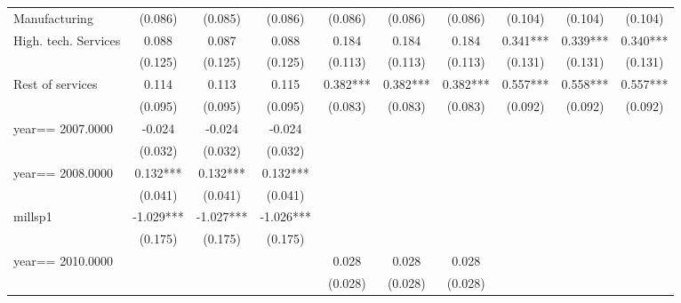 \begin{table}[htbp]
\begin{tabular}{l*{9}{c}}
Manufacturing       &     (0.086)   &     (0.085)   &     (0.086)   &     (0.086)   &     (0.086)   &     (0.086)   &     (0.104)   &     (0.104)   &     (0.104)   \\
High. tech. Services&       0.088   &       0.087   &       0.088   &       0.184   &       0.184   &       0.184   &       0.341***&       0.339***&       0.340***\\
                    &     (0.125)   &     (0.125)   &     (0.125)   &     (0.113)   &     (0.113)   &     (0.113)   &     (0.131)   &     (0.131)   &     (0.131)   \\
Rest of services    &       0.114   &       0.113   &       0.115   &       0.382***&       0.382***&       0.382***&       0.557***&       0.558***&       0.557***\\
                    &     (0.095)   &     (0.095)   &     (0.095)   &     (0.083)   &     (0.083)   &     (0.083)   &     (0.092)   &     (0.092)   &     (0.092)   \\
year==  2007.0000   &      -0.024   &      -0.024   &      -0.024   &               &               &               &               &               &               \\
                    &     (0.032)   &     (0.032)   &     (0.032)   &               &               &               &               &               &               \\
year==  2008.0000   &       0.132***&       0.132***&       0.132***&               &               &               &               &               &               \\
                    &     (0.041)   &     (0.041)   &     (0.041)   &               &               &               &               &               &               \\
millsp1             &      -1.029***&      -1.027***&      -1.026***&               &               &               &               &               &               \\
                    &     (0.175)   &     (0.175)   &     (0.175)   &               &               &               &               &               &               \\
year==  2010.0000   &               &               &               &       0.028   &       0.028   &       0.028   &               &               &               \\
                    &               &               &               &     (0.028)   &     (0.028)   &     (0.028)   &               &               &               \\

\end{tabular}
\end{table}
